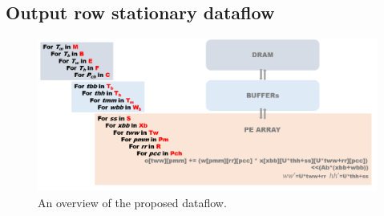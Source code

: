 \subsection{Output row stationary dataflow}
\begin{figure}[h]
    \centering
    \includegraphics[width=1\linewidth]{inc/4_proposed_architecture/figure/dataflow.png}
    \caption{An overview of the proposed dataflow.}
    \label{fig:dataflow}
\end{figure}

